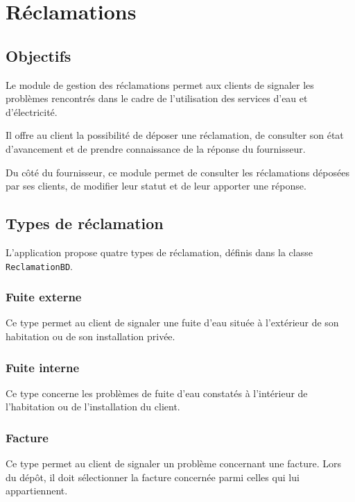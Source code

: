 
\chapter{Réclamations}
\label{chap:reclamations}

\section{Objectifs}

Le module de gestion des réclamations permet aux clients de signaler les problèmes rencontrés dans le cadre de l'utilisation des services d'eau et d'électricité.

Il offre au client la possibilité de déposer une réclamation, de consulter son état d'avancement et de prendre connaissance de la réponse du fournisseur.

Du côté du fournisseur, ce module permet de consulter les réclamations déposées par ses clients, de modifier leur statut et de leur apporter une réponse.

\section{Types de réclamation}

L'application propose quatre types de réclamation, définis dans la classe \texttt{ReclamationBD}.

\subsection{Fuite externe}

Ce type permet au client de signaler une fuite d'eau située à l'extérieur de son habitation ou de son installation privée.

\subsection{Fuite interne}

Ce type concerne les problèmes de fuite d'eau constatés à l'intérieur de l'habitation ou de l'installation du client.

\subsection{Facture}

Ce type permet au client de signaler un problème concernant une facture. Lors du dépôt, il doit sélectionner la facture concernée parmi celles qui lui appartiennent.

